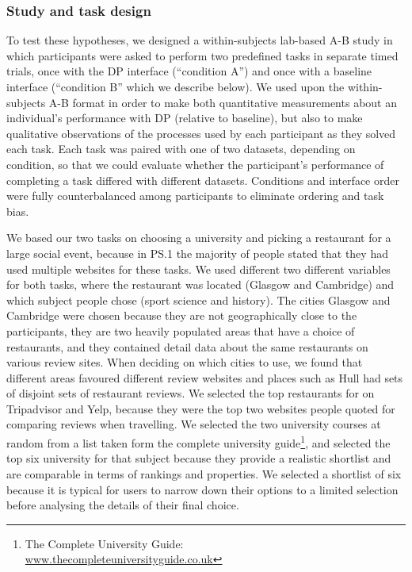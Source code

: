 \documentclass{sigchi}
\begin{document}
\subsubsection{Study and task design}
To test these hypotheses, we designed a within-subjects lab-based A-B study in which participants were asked to perform two predefined tasks in separate timed trials, once with the DP interface (``condition A'') and once with a baseline interface (``condition B'' which we describe below).  We used upon the within-subjects A-B format in order to make both quantitative measurements about an individual's performance with DP (relative to baseline), but also to make qualitative observations of the processes used by each participant as they solved each task.  Each task was paired with one of two datasets, depending on condition, so that we could evaluate whether the participant's performance of completing a task differed with different datasets.  Conditions and interface order were fully counterbalanced among participants to eliminate ordering and task bias.  

We based our two tasks on choosing a university and picking a restaurant for a large social event, because in PS.1 the majority of people stated that they had used multiple websites for these tasks.  We used different two different variables for both tasks, where the restaurant was located (Glasgow and Cambridge) and which subject people chose (sport science and history).  The cities Glasgow and Cambridge were chosen because they are not geographically close to the participants, they are two heavily populated areas that have a choice of restaurants, and they contained detail data about the same restaurants on various review sites.  When deciding on which cities to use, we found that different areas favoured different review websites and places such as Hull had sets of disjoint sets of restaurant reviews.  We selected the top restaurants for on Tripadvisor and Yelp, because they were the top two websites people quoted for comparing reviews when travelling.  We selected the two university courses at random from a list taken form the complete university guide\footnote{The Complete University Guide:\\\url{www.thecompleteuniversityguide.co.uk}}, and selected the top six university for that subject because they provide a realistic shortlist and are comparable in terms of rankings and properties.   We selected a shortlist of six because it is typical for users to narrow down their options to a limited selection before analysing the details of their final choice.
\end{document}
